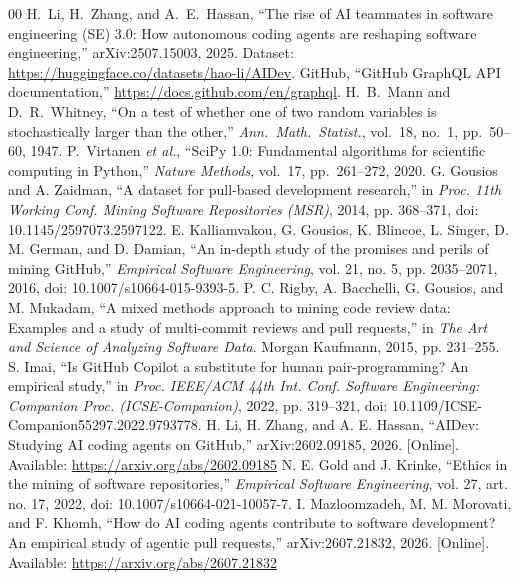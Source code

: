 \documentclass[conference]{IEEEtran}
\begin{document}
\begin{thebibliography}{00}
 H.~Li, H.~Zhang, and A.~E.~Hassan, ``The rise of AI teammates in software engineering (SE) 3.0: How autonomous coding agents are reshaping software engineering,'' arXiv:2507.15003, 2025. Dataset: \url{https://huggingface.co/datasets/hao-li/AIDev}.
 GitHub, ``GitHub GraphQL API documentation,'' \url{https://docs.github.com/en/graphql}.
 H.~B.~Mann and D.~R.~Whitney, ``On a test of whether one of two random variables is stochastically larger than the other,'' \emph{Ann.\ Math.\ Statist.}, vol.~18, no.~1, pp.~50--60, 1947.
 P.~Virtanen \emph{et al.}, ``SciPy 1.0: Fundamental algorithms for scientific computing in Python,'' \emph{Nature Methods}, vol.~17, pp.~261--272, 2020.
G. Gousios and A. Zaidman, ``A dataset for pull-based development research,'' in \emph{Proc. 11th Working Conf. Mining Software Repositories (MSR)}, 2014, pp. 368--371, doi: 10.1145/2597073.2597122.
E. Kalliamvakou, G. Gousios, K. Blincoe, L. Singer, D. M. German, and D. Damian, ``An in-depth study of the promises and perils of mining GitHub,'' \emph{Empirical Software Engineering}, vol. 21, no. 5, pp. 2035--2071, 2016, doi: 10.1007/s10664-015-9393-5.
P. C. Rigby, A. Bacchelli, G. Gousios, and M. Mukadam, ``A mixed methods approach to mining code review data: Examples and a study of multi-commit reviews and pull requests,'' in \emph{The Art and Science of Analyzing Software Data}. Morgan Kaufmann, 2015, pp. 231--255.
S. Imai, ``Is GitHub Copilot a substitute for human pair-programming? An empirical study,'' in \emph{Proc. IEEE/ACM 44th Int. Conf. Software Engineering: Companion Proc. (ICSE-Companion)}, 2022, pp. 319--321, doi: 10.1109/ICSE-Companion55297.2022.9793778.
H. Li, H. Zhang, and A. E. Hassan, ``AIDev: Studying AI coding agents on GitHub,'' arXiv:2602.09185, 2026. [Online]. Available: \url{https://arxiv.org/abs/2602.09185}
N. E. Gold and J. Krinke, ``Ethics in the mining of software repositories,'' \emph{Empirical Software Engineering}, vol. 27, art. no. 17, 2022, doi: 10.1007/s10664-021-10057-7.
I. Mazloomzadeh, M. M. Morovati, and F. Khomh, ``How do AI coding agents contribute to software development? An empirical study of agentic pull requests,'' arXiv:2607.21832, 2026. [Online]. Available: \url{https://arxiv.org/abs/2607.21832}
\end{thebibliography}
\end{document}
